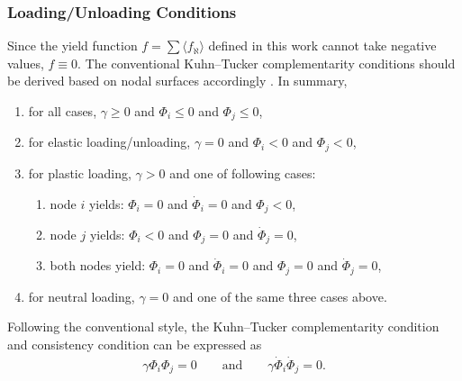 \subsubsection{Loading/Unloading Conditions}
Since the yield function $f=\sum{}\langle{}f_\aleph\rangle$ defined in this work cannot take negative values, $f\equiv0$. The conventional Kuhn--Tucker complementarity conditions should be derived based on nodal surfaces accordingly \cite{Simo1998}. In summary,
\begin{enumerate}
\item for all cases, $\gamma\geqslant0$ and $\Phi_i\leqslant0$ and $\Phi_j\leqslant0$,
\item for elastic loading/unloading, $\gamma=0$ and $\Phi_i<0$ and $\Phi_j<0$,
\item for plastic loading, $\gamma>0$ and one of following cases:
\begin{enumerate}
\item node $i$ yields: $\Phi_i=0$ and $\dot{\Phi}_i=0$ and $\Phi_j<0$,
\item node $j$ yields: $\Phi_i<0$ and $\Phi_j=0$ and $\dot{\Phi}_j=0$,
\item both nodes yield: $\Phi_i=0$ and $\dot{\Phi}_i=0$ and $\Phi_j=0$ and $\dot{\Phi}_j=0$,
\end{enumerate}
\item for neutral loading, $\gamma=0$ and one of the same three cases above.
\end{enumerate}
Following the conventional style, the Kuhn--Tucker complementarity condition and consistency condition can be expressed as
\begin{gather}
\gamma\Phi_i\Phi_j=0\qquad\text{and}\qquad\gamma\dot{\Phi}_i\dot{\Phi}_j=0.
\end{gather}
